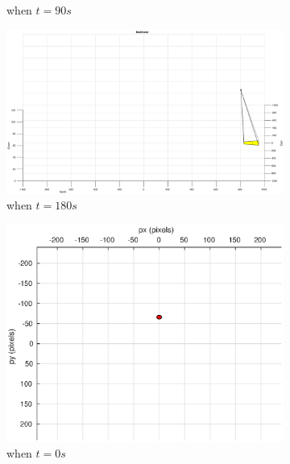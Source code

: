 \begin{figure}[htbp]
\begin{subfigure}[t]{0.32\linewidth}
		\caption{when $t=90s$}
	\end{subfigure}
	\begin{subfigure}[t]{0.32\linewidth}
		\includegraphics[width=\textwidth]{images/chapter4/inertial_UAV_5mps_180s}
		\caption{when $t=180s$}
	\end{subfigure}
	\begin{subfigure}[t]{0.32\linewidth}
		\includegraphics[width=\textwidth]{images/chapter4/inertial_camera_5mps}
		\caption{when $t=0s$}
	\end{subfigure}
	\begin{subfigure}[t]{0.32\linewidth}

\end{subfigure}
\end{figure}
